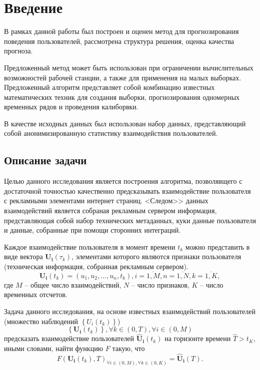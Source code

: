 \documentclass[a4paper, 14pt]{extreport}
\begin{document}
    \section{Введение}

    В рамках данной работы был построен и оценен метод для прогнозирования поведения пользователей, рассмотрена
    структура решения, оценка качества прогноза.

    Предложенный метод может быть использован при ограничении вычислительных возможностей рабочей станции, а также
    для применения на малых выборках.
    Предложенный алгоритм представляет собой комбинацию известных математических
    техник для создания выборки, прогнозирования одномерных временных рядов и проведения калиборвки.

    В качестве исходных данных был использован набор данных, представляющий собой анонимизированную статистику
    взаимодействия пользователей.

    \subsection*{Описание задачи}

    Целью данного исследования является построения алгоритма, позволявщего с достаточной точностью качественно
    предсказывать взаимодействие пользователя с рекламными элементами интернет страниц.
    <Следом>> данных взаимодействий является собраная рекламным сервером информация, представляющая собой набор
    технических метаданных, куки данные пользователя и данные, собранные при помощи сторонних интеграций.

    Каждое взаимодействие пользователя в момент времени $t_k$ можно представить в виде вектора $\mathbf{U_i}(\tau_k)$,
    элементами которого являются признаки пользователя (техническая информация, собранная рекламным сервером).
    \begin{equation}
        \mathbf{U_i}\left(t_k\right) =
        \left( u_1, u_2, \dots, u_n, t_k \right),
        i = \overline{1, M}, n = \overline{1, N}, k = \overline{1, K},
    \end{equation} где $M$ -- общее число взаимодействий, $N$ -- число признаков, $K$ -- число временных отсчетов.

    Задача данного исследования, на основе известных взаимодействий пользователей
    (множество наблюдений $\left\{ U_i \left(t_k\right) \right\}$)
    \begin{equation}
        \left\{ \mathbf{U_i}\left(t_k\right)\right\},
        \forall k \in \left(0, T\right),
        \forall i \in \left( 0, M \right)
    \end{equation}
    предсказать взаимодействие пользователей $\mathbf{\widehat{U}_i}\left(t_k\right)$ на горизонте времени
    $\widehat{T} > t_K$, иными словами, найти функцию $F$ такую, что
    \begin{equation}
        F\left( \mathbf{U_i}\left(t_k \right), T \right)_{
        \forall i \in (0, M),
        \forall k \in \left(0, K\right)}
        = \mathbf{\widehat{U}_i}\left(T\right).
    \end{equation}
\end{document}
